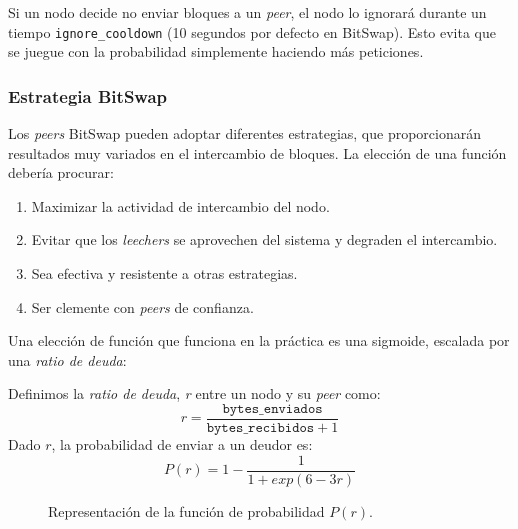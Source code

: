 \documentclass[12pt]{article} %
\begin{document}
Si un nodo decide no enviar bloques a un \textit{peer}, el nodo lo ignorará durante un tiempo \texttt{ignore\_cooldown} (10 segundos por defecto en BitSwap). Esto evita que se juegue con la probabilidad simplemente haciendo más peticiones.


\subsubsection{Estrategia BitSwap} %
\label{ssub:estrategia_bitswap}

Los \textit{peers} BitSwap pueden adoptar diferentes estrategias, que proporcionarán resultados muy variados en el intercambio de bloques. La elección de una función debería procurar:
\begin{enumerate}
	\item Maximizar la actividad de intercambio del nodo.
	\item Evitar que los \textit{leechers} se aprovechen del sistema y degraden el intercambio.
	\item Sea efectiva y resistente a otras estrategias.
	\item Ser clemente con \textit{peers} de confianza.
\end{enumerate}
Una elección de función que funciona en la práctica es una sigmoide, escalada por una \textit{ratio de deuda}:

Definimos la \textit{ratio de deuda}, \textit{r} entre un nodo y su \textit{peer} como:
\begin{equation*}
	r = \frac{\texttt{bytes\_enviados}}{\texttt{bytes\_recibidos} + 1}
\end{equation*}
Dado $r$, la probabilidad de enviar a un deudor es:
\begin{equation*}
	P(r) = 1 - \frac{1}{1 + exp(6-3r)}
\end{equation*}

\begin{figure}[H]
	\centering
	\caption{Representación de la función de probabilidad $P(r)$.}
	\label{fig:prob}
\end{figure}
\end{document}
